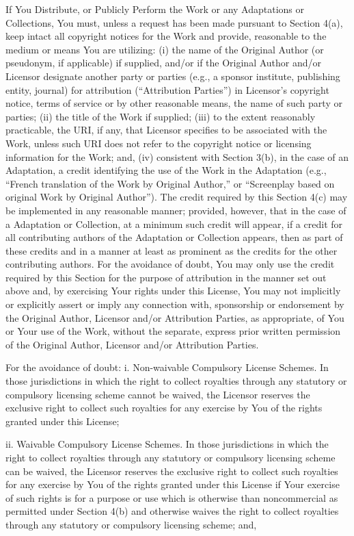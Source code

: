 \documentclass[oneside]{book}
\begin{document}
If You Distribute, or Publicly Perform the Work or any Adaptations or
Collections, You must, unless a request has been made pursuant to Section 4(a),
keep intact all copyright notices for the Work and provide, reasonable to the
medium or means You are utilizing: (i) the name of the Original Author (or
pseudonym, if applicable) if supplied, and/or if the Original Author and/or
Licensor designate another party or parties (e.g., a sponsor institute,
publishing entity, journal) for attribution (``Attribution Parties'') in
Licensor's copyright notice, terms of service or by other reasonable means, the
name of such party or parties; (ii) the title of the Work if supplied; (iii) to
the extent reasonably practicable, the URI, if any, that Licensor specifies to
be associated with the Work, unless such URI does not refer to the copyright
notice or licensing information for the Work; and, (iv) consistent with Section
3(b), in the case of an Adaptation, a credit identifying the use of the Work in
the Adaptation (e.g., ``French translation of the Work by Original Author,'' or
``Screenplay based on original Work by Original Author''). The credit required
by this Section 4(c) may be implemented in any reasonable manner; provided,
however, that in the case of a Adaptation or Collection, at a minimum such
credit will appear, if a credit for all contributing authors of the Adaptation
or Collection appears, then as part of these credits and in a manner at least as
prominent as the credits for the other contributing authors. For the avoidance
of doubt, You may only use the credit required by this Section for the purpose
of attribution in the manner set out above and, by exercising Your rights under
this License, You may not implicitly or explicitly assert or imply any
connection with, sponsorship or endorsement by the Original Author, Licensor
and/or Attribution Parties, as appropriate, of You or Your use of the Work,
without the separate, express prior written permission of the Original Author,
Licensor and/or Attribution Parties.

For the avoidance of doubt:
i.  Non-waivable Compulsory License Schemes. In those jurisdictions in which the
right to collect royalties through any statutory or compulsory licensing scheme
cannot be waived, the Licensor reserves the exclusive right to collect such
royalties for any exercise by You of the rights granted under this License;

ii.  Waivable Compulsory License Schemes. In those jurisdictions in which the
right to collect royalties through any statutory or compulsory licensing scheme
can be waived, the Licensor reserves the exclusive right to collect such
royalties for any exercise by You of the rights granted under this License if
Your exercise of such rights is for a purpose or use which is otherwise than
noncommercial as permitted under Section 4(b) and otherwise waives the right to
collect royalties through any statutory or compulsory licensing scheme; and,
\end{document}
